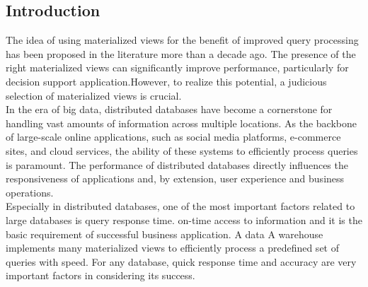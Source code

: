 \subsection{Introduction}
The idea of using materialized views for the benefit of improved query processing has been proposed
in the literature more than a decade ago. The presence of the right materialized views can significantly improve performance, particularly for decision support application.However, to realize this potential, a judicious selection of materialized views is crucial.\cite{agrawal2000automated}\\
In the era of big data, distributed databases have become a cornerstone for handling vast amounts of information across multiple locations. As the backbone of large-scale online applications, such as social media platforms, e-commerce sites, and cloud services, the ability of these systems to efficiently process queries is paramount. The performance of distributed databases directly influences the responsiveness of applications and, by extension, user experience and business operations.\cite{4}\\
Especially in distributed databases, one of the most important factors related to large databases is query response time.
on-time access to information and it is the basic requirement of successful business application. A data
A warehouse implements many materialized views to efficiently process a predefined set of queries with speed. For any database, quick response time and accuracy are very important factors in considering its success.\cite{karde2010selection} 

